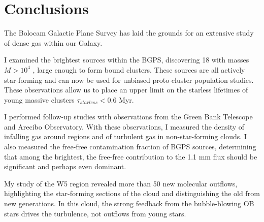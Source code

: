 
\chapter{Conclusions}
\label{ch:conclusion}
The Bolocam Galactic Plane Survey has laid the grounds for an extensive study
of dense gas within our Galaxy.

I examined the brightest sources within the BGPS, discovering 18 with masses
$M>10^4$ \msun, large enough to form bound clusters.  These sources are all
actively star-forming and can now be used for unbiased proto-cluster population
studies.  These observations allow us to place an upper limit on the starless
lifetimes of young massive clusters $\tau_{starless} < 0.6$ Myr.

I performed follow-up studies with \formaldehyde observations from the Green
Bank Telescope and Arecibo Observatory.  With these observations, I measured
the density of infalling gas around \uchii regions and of turbulent gas in
non-star-forming clouds.  I also measured the free-free contamination fraction
of BGPS sources, determining that among the brightest, the free-free contribution
to the 1.1 mm flux should be significant and perhaps even dominant.

My study of the W5 region revealed more than 50 new molecular outflows,
highlighting the star-forming sections of the cloud and distinguishing the old
from new generations.  In this cloud, the strong feedback from the
bubble-blowing OB stars drives the turbulence, not outflows from young stars.




